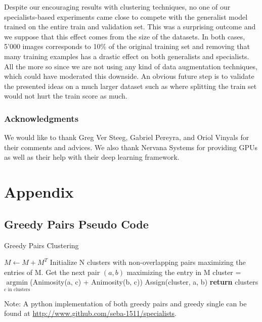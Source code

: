 \documentclass[12pt]{article}
\begin{document}
Despite our encouraging results with clustering techniques, no one of
our specialists-based experiments came close to compete with the
generalist model trained on the entire train and validation set. This
was a surprising outcome and we suppose that this effect comes from the
size of the datasets. In both cases, 5'000 images corresponds to 10\% of
the original training set and removing that many training examples has a
drastic effect on both generalists and specialists. All the more so
since we are not using any kind of data augmentation techniques, which
could have moderated this downside. An obvious future step is to
validate the presented ideas on a much larger dataset such as
\cite{imagenet} where splitting the train set would not hurt the train
score as much.

\subsubsection{Acknowledgments}\label{acknowledgments}

We would like to thank Greg Ver Steeg, Gabriel Pereyra, and Oriol
Vinyals for their comments and advices. We also thank Nervana Systems
for providing GPUs as well as their help with their deep learning
framework.





\section{Appendix}\label{appendix}

\subsection{Greedy Pairs Pseudo Code}\label{greedy-pairs-pseudo-code}

\begin{algorithm}
    \caption{Greedy Pairs Clustering}
    \label{greedy_pairs}
    \begin{algorithmic}[1] %
         
            \State $M\gets M + M^T$
            \State Initialize N clusters with non-overlapping pairs maximizing the entries of M.
                \State Get the next pair $(a, b)$ maximizing the entry in M
                \State cluster = $\underset{\text{c in clusters}}{\mathrm{argmin}}$(Animosity(a, c) + Animosity(b, c))
                \State Assign(cluster, a, b)
            \EndWhile\label{euclidendwhile}
            \State \textbf{return} clusters
        \EndProcedure
    \end{algorithmic}
\end{algorithm}

Note: A python implementation of both greedy pairs and greedy single can
be found at \url{http://www.github.com/seba-1511/specialists}.

\end{document}
